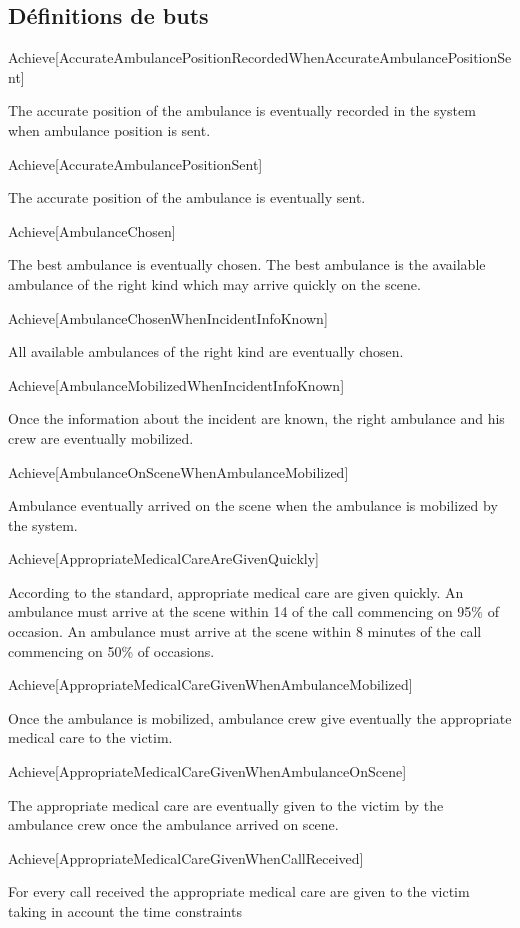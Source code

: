 \subsection{Définitions de buts}


Achieve[AccurateAmbulancePositionRecordedWhenAccurateAmbulancePositionSent]

The accurate position of the ambulance is eventually recorded in the system when ambulance position is sent.


Achieve[AccurateAmbulancePositionSent]

The accurate position of the ambulance is eventually sent.


Achieve[AmbulanceChosen]

The best ambulance is eventually chosen. The best ambulance is the available ambulance of the right kind which may arrive quickly on the scene.


Achieve[AmbulanceChosenWhenIncidentInfoKnown]

All available ambulances of the right kind are eventually chosen.


Achieve[AmbulanceMobilizedWhenIncidentInfoKnown]

Once the information about the incident are known, the right ambulance and his crew are eventually mobilized.


Achieve[AmbulanceOnSceneWhenAmbulanceMobilized]

Ambulance eventually arrived on the scene when the ambulance is mobilized by the system.


Achieve[AppropriateMedicalCareAreGivenQuickly]

According to the standard, appropriate medical care are given quickly. An ambulance must arrive at the scene within 14 of the call commencing on 95\% of occasion. An ambulance must arrive at the scene within 8 minutes of the call commencing on 50\% of occasions.


Achieve[AppropriateMedicalCareGivenWhenAmbulanceMobilized]

Once the ambulance is mobilized, ambulance crew  give eventually the appropriate medical care to the victim.


Achieve[AppropriateMedicalCareGivenWhenAmbulanceOnScene]

The appropriate medical care are eventually given to the victim by the ambulance crew once the ambulance arrived on scene.


Achieve[AppropriateMedicalCareGivenWhenCallReceived]

For every call received the appropriate medical care are given to the victim taking in account the time constraints


